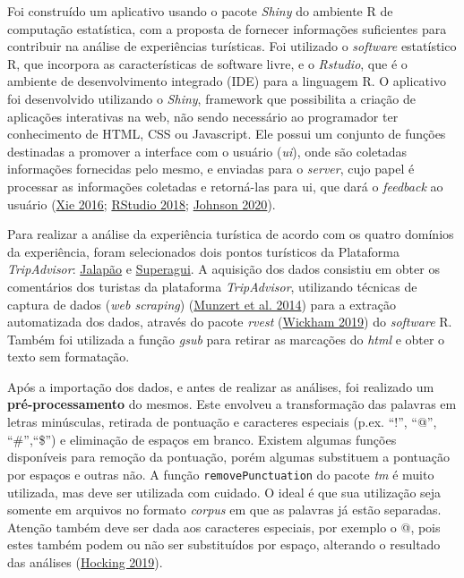 \documentclass[preprint, 3p,
authoryear]{elsarticle} %
\begin{document}
Foi construído um aplicativo usando o pacote \emph{Shiny} do ambiente R
de computação estatística, com a proposta de fornecer informações
suficientes para contribuir na análise de experiências turísticas. Foi
utilizado o \emph{software} estatístico R, que incorpora as
características de software livre, e o \emph{Rstudio}, que é o ambiente
de desenvolvimento integrado (IDE) para a linguagem R. O aplicativo foi
desenvolvido utilizando o \emph{Shiny}, framework que possibilita a
criação de aplicações interativas na web, não sendo necessário ao
programador ter conhecimento de HTML, CSS ou Javascript. Ele possui um
conjunto de funções destinadas a promover a interface com o usuário
(\emph{ui}), onde são coletadas informações fornecidas pelo mesmo, e
enviadas para o \emph{server}, cujo papel é processar as informações
coletadas e retorná-las para ui, que dará o \emph{feedback} ao usuário
(\protect\hyperlink{ref-Xie2016}{Xie 2016};
\protect\hyperlink{ref-RStudio2018}{RStudio 2018};
\protect\hyperlink{ref-Johnson2020}{Johnson 2020}).

Para realizar a análise da experiência turística de acordo com os quatro
domínios da experiência, foram selecionados dois pontos turísticos da
Plataforma \emph{TripAdvisor}:
\href{https://www.tripadvisor.com.br/Attraction_Review-g668997-d17816411-Reviews-JALAPAO_OFICIAL-Palmas_State_of_Tocantins.html}{Jalapão}
e
\href{https://www.tripadvisor.com.br/Tourism-g3842996-Ilha_do_Superagui_State_of_Parana-Vacations.html}{Superagui}.
A aquisição dos dados consistiu em obter os comentários dos turistas da
plataforma \emph{TripAdvisor}, utilizando técnicas de captura de dados
(\emph{web scraping})
(\protect\hyperlink{ref-munzert2014automated}{Munzert et al. 2014}) para
a extração automatizada dos dados, através do pacote \emph{rvest}
(\protect\hyperlink{ref-Wickham2019}{Wickham 2019}) do \emph{software}
R. Também foi utilizada a função \emph{gsub} para retirar as marcações
do \emph{html} e obter o texto sem formatação.

Após a importação dos dados, e antes de realizar as análises, foi
realizado um \textbf{pré-processamento} do mesmos. Este envolveu a
transformação das palavras em letras minúsculas, retirada de pontuação e
caracteres especiais (p.ex. ``!'', ``@'', ``\#'',``\$'') e eliminação de
espaços em branco. Existem algumas funções disponíveis para remoção da
pontuação, porém algumas substituem a pontuação por espaços e outras
não. A função \texttt{removePunctuation} do pacote \emph{tm} é muito
utilizada, mas deve ser utilizada com cuidado. O ideal é que sua
utilização seja somente em arquivos no formato \emph{corpus} em que as
palavras já estão separadas. Atenção também deve ser dada aos caracteres
especiais, por exemplo o @, pois estes também podem ou não ser
substituídos por espaço, alterando o resultado das análises
(\protect\hyperlink{ref-Hocking2019}{Hocking 2019}).
\end{document}
